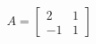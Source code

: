 \documentclass[preview]{standalone}
\begin{document}
\begin{align*}
A = \begin{bmatrix} 2 & 1 \\ -1 & 1 \end{bmatrix}
\end{align*}
\end{document}
